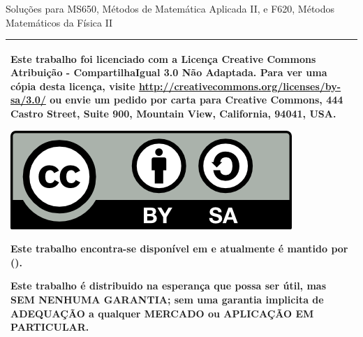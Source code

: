 % 
% 
% 
% 
% 
% 
%
%
\begin{center}
    \LARGE{Solu\c{c}\~{o}es para MS650, M\'{e}todos de Matem\'{a}tica Aplicada II, e F620, M\'{e}todos Matem\'{a}ticos da F\'{i}sica II}
    
    \Large{\mycheader}
\end{center}
\vspace{.5\textheight}

\begin{tabular}{|p{}|}
\hline
Este trabalho foi licenciado com a Licen\c{c}a Creative Commons Atribui\c{c}\~{a}o - CompartilhaIgual 3.0 N\~{a}o Adaptada. Para ver uma c\'{o}pia desta licen\c{c}a, visite \url{http://creativecommons.org/licenses/by-sa/3.0/} ou envie um pedido por carta para Creative Commons, 444 Castro Street, Suite 900, Mountain View, California, 94041, USA.
\begin{center}
\includegraphics[scale=1]{cc-by-sa.png}
\end{center}
Este trabalho encontra-se dispon\'{i}vel em  e atualmente \'{e} mantido por  ().

Este trabalho \'{e} distribuido na esperança que possa ser \'{u}til, mas SEM NENHUMA GARANTIA; sem uma garantia implicita de ADEQUA\c{C}\~{A}O a qualquer MERCADO ou APLICA\c{C}\~{A}O EM PARTICULAR.
\\ \hline
\end{tabular}
